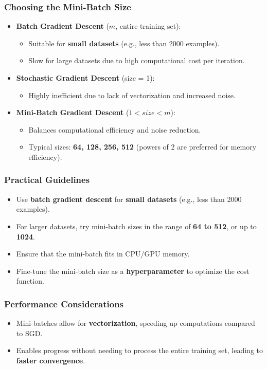 \documentclass[letterpaper,12pt,notitlepage,twoside]{report}
\begin{document}
\subsubsection{Choosing the Mini-Batch Size}
\begin{itemize}[nosep]
    \item \textbf{Batch Gradient Descent} (\( m \),  entire training set):
    \begin{itemize}
        \item Suitable for \textbf{small datasets} (e.g., less than 2000 examples).
        \item Slow for large datasets due to high computational cost per iteration.
    \end{itemize}
    \item \textbf{Stochastic Gradient Descent} (size = 1):
    \begin{itemize}
        \item Highly inefficient due to lack of vectorization and increased noise.
    \end{itemize}
    \item \textbf{Mini-Batch Gradient Descent} (\( 1 < size < m \)):
    \begin{itemize}
        \item Balances computational efficiency and noise reduction.
        \item Typical sizes: \textbf{64, 128, 256, 512} (powers of 2 are preferred for memory efficiency).
    \end{itemize}
\end{itemize}

\subsubsection{Practical Guidelines}
\begin{itemize}[nosep]
    \item Use \textbf{batch gradient descent} for \textbf{small datasets} (e.g., less than 2000 examples).
    \item For larger datasets, try mini-batch sizes in the range of \textbf{64 to 512}, or up to \textbf{1024}.
    \item Ensure that the mini-batch fits in CPU/GPU memory.
    \item Fine-tune the mini-batch size as a \textbf{hyperparameter} to optimize the cost function.
\end{itemize}

\subsubsection{Performance Considerations}
\begin{itemize}[nosep]
    \item Mini-batches allow for \textbf{vectorization}, speeding up computations compared to SGD.
    \item Enables progress without needing to process the entire training set, leading to \textbf{faster convergence}.
\end{itemize}
\end{document}
